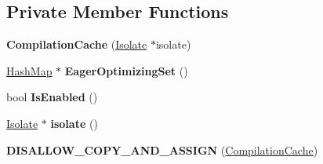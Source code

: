 \subsection*{Private Member Functions}
\begin{DoxyCompactItemize}
\item 
{\bfseries Compilation\+Cache} (\hyperlink{classv8_1_1internal_1_1_isolate}{Isolate} $\ast$isolate)\hypertarget{classv8_1_1internal_1_1_compilation_cache_a11cb1915af7ffaabd9f2310176cd4a2b}{}\label{classv8_1_1internal_1_1_compilation_cache_a11cb1915af7ffaabd9f2310176cd4a2b}

\item 
\hyperlink{classv8_1_1internal_1_1_template_hash_map_impl}{Hash\+Map} $\ast$ {\bfseries Eager\+Optimizing\+Set} ()\hypertarget{classv8_1_1internal_1_1_compilation_cache_accf6d1fa9d9d2ae83b99540f29064a1d}{}\label{classv8_1_1internal_1_1_compilation_cache_accf6d1fa9d9d2ae83b99540f29064a1d}

\item 
bool {\bfseries Is\+Enabled} ()\hypertarget{classv8_1_1internal_1_1_compilation_cache_a569cf1348be8d65e80deeda5ed66f23d}{}\label{classv8_1_1internal_1_1_compilation_cache_a569cf1348be8d65e80deeda5ed66f23d}

\item 
\hyperlink{classv8_1_1internal_1_1_isolate}{Isolate} $\ast$ {\bfseries isolate} ()\hypertarget{classv8_1_1internal_1_1_compilation_cache_a5fe21512a164d2e9219c9d711dc494d4}{}\label{classv8_1_1internal_1_1_compilation_cache_a5fe21512a164d2e9219c9d711dc494d4}

\item 
{\bfseries D\+I\+S\+A\+L\+L\+O\+W\+\_\+\+C\+O\+P\+Y\+\_\+\+A\+N\+D\+\_\+\+A\+S\+S\+I\+GN} (\hyperlink{classv8_1_1internal_1_1_compilation_cache}{Compilation\+Cache})\hypertarget{classv8_1_1internal_1_1_compilation_cache_aa30e1e80a08c8add32e750280eb102a6}{}\label{classv8_1_1internal_1_1_compilation_cache_aa30e1e80a08c8add32e750280eb102a6}

\end{DoxyCompactItemize}
